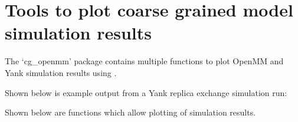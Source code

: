 \documentclass[letterpaper,12pt,english,openany,oneside]{sphinxmanual}
\begin{document}
\begin{fulllineitems}
\end{fulllineitems}


\newpage


\section{Tools to plot coarse grained model simulation results}
\label{\detokenize{simulation:tools-to-plot-coarse-grained-model-simulation-results}}
The ‘cg\_openmm’ package contains multiple functions to plot OpenMM and Yank simulation results using  .

Shown below is example output from a Yank replica exchange simulation run:

\noindent{}

\noindent{}

Shown below are functions which allow plotting of simulation results.

\label{\detokenize{simulation:module-simulation.rep_exch}}
\end{document}
